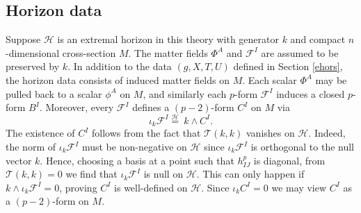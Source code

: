 \documentclass[11pt, reqno]{amsart}
\theoremstyle{plain}
\theoremstyle{definition}
\numberwithin{equation}{section}
\begin{document}
\subsection{Horizon data} Suppose $\mathcal{H}$ is an extremal horizon in this theory with generator $k$ and compact $n$-dimensional cross-section $M$. The matter fields $\Phi^A$ and $\mathcal{F}^I$ are assumed to be preserved by $k$. In addition to the data $(g,X,T,U)$ defined in Section \ref{ehors}, the horizon data consists of induced matter fields on $M$. Each scalar $\Phi^A$ may be pulled back to a scalar $\phi^A$ on $M$, and similarly each $p$-form $\mathcal{F}^I$ induces a closed $p$-form $B^I$. Moreover, every $\mathcal{F}^I$ defines a $(p-2)$-form $C^I$ on $M$ via
\begin{equation*}
    \iota_k \mathcal{F} ^I
    \overset{\mathcal{H}}{=}\: k \wedge C^I.
\end{equation*}
The existence of $C^I$ follows from the fact that $\mathcal{T}(k,k)$ vanishes on $\mathcal{H}$. Indeed, the norm of $\iota_k \mathcal{F}^I$ must be non-negative on $\mathcal{H}$ since $\iota_k\mathcal{F}^I$ is orthogonal to the null vector $k$. Hence, choosing a basis at a point such that $h^p_{IJ}$ is diagonal, from $\mathcal{T}(k,k) = 0$ we find that $\iota_k \mathcal{F}^I$ is null on $\mathcal{H}$. This can only happen if $k \wedge \iota_k \mathcal{F}^I = 0$, proving $C^I$ is well-defined on $\mathcal{H}$. Since $\iota_kC^I = 0$ we may view $C^I$ as a $(p-2)$-form on $M$. 
\end{document}
